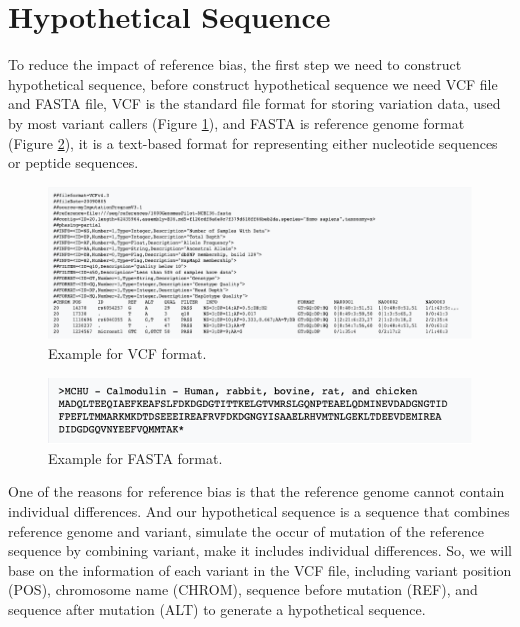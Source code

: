 \section{Hypothetical Sequence}
To reduce the impact of reference bias, the first step we need to construct hypothetical sequence, before construct hypothetical sequence we need VCF file and FASTA file, VCF is the standard file format for storing variation data, used by most variant callers (Figure \ref{f3-2}), and FASTA is reference genome format (Figure \ref{f3-3}), it is a text-based format for representing either nucleotide sequences or peptide sequences.

\begin{figure}[H]
    \centering
    \includegraphics[width=1\columnwidth]{body/image/3-2.png}
    \captionsetup{labelfont=bf}
    \renewcommand{\baselinestretch}{1.0}
    \vspace{-1cm}
    \caption[VCF format]{Example for VCF format.}
    \label{f3-2}
\end{figure}

\begin{figure}[H]
    \centering
    \includegraphics[width=1\columnwidth]{body/image/3-3.png}
    \captionsetup{labelfont=bf}
    \renewcommand{\baselinestretch}{1.0}
    \vspace{-1cm}
    \caption[FASTA format]{Example for FASTA format.}
    \label{f3-3}
\end{figure}

One of the reasons for reference bias is that the reference genome cannot contain individual differences. And our hypothetical sequence is a sequence that combines reference genome and variant, simulate the occur of mutation of the reference sequence by combining variant, make it includes individual differences. So, we will base on the information of each variant in the VCF file, including variant position (POS), chromosome name (CHROM), sequence before mutation (REF), and sequence after mutation (ALT) to generate a hypothetical sequence. 

